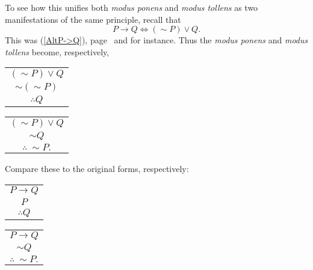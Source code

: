 \eex

To see how this unifies both {\it modus ponens} and {\it modus tollens}
as two manifestations of the same principle, recall that
$$P\longrightarrow Q\iff(\sim P)\vee Q.$$
This was (\ref{AltP->Q}), page~\pageref{AltP->Q} and for instance.
Thus the {\it modus ponens} and {\it modus tollens} become, 
respectively,\footnotemark
\begin{multicols}{2}
\begin{center}
\begin{tabular}{c}
$(\sim P)\vee Q$\\
$\sim(\sim P)$\\
\hline
$\therefore Q$
\end{tabular}

\begin{tabular}{c}
$(\sim P)\vee Q$\\
$\sim Q$\\
\hline
$\therefore\ \sim P.$
\end{tabular}
\end{center}
\end{multicols}
Compare these to the original forms, respectively:
\begin{multicols}{2}
\begin{center}
\begin{tabular}{c}
$P\longrightarrow Q$\\
$P$\\
\hline
$\therefore Q$
\end{tabular}

\begin{tabular}{c}
$P\longrightarrow Q$\\
$\sim Q$\\
\hline
$\therefore\ \sim P.$
\end{tabular}
\end{center}
\end{multicols}




